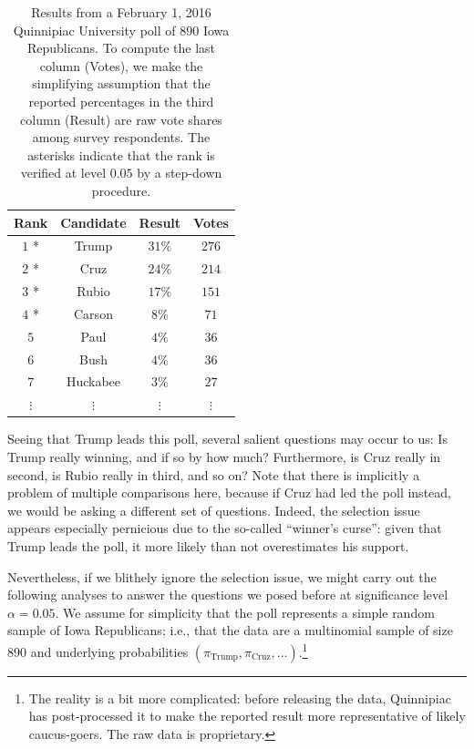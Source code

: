\documentclass[11pt]{article}
\theoremstyle{definition}
\theoremstyle{custom}
\begin{document}
\begin{table}[htbp]
\centering
\begin{tabular}{c c c c}
	\hline
	Rank & Candidate & Result & Votes \\
	\hline
	$1$ * & Trump & $31\%$ & $276$ \\
	$2$ * & Cruz & $24\%$ & $214$ \\
	$3$ * & Rubio & $17\%$ & $151$ \\
	$4$ * & Carson & $8\%$ & $71$ \\
	$5$ & Paul & $4\%$ & $36$ \\
	$6$ & Bush & $4\%$ & $36$ \\
	$7$ & Huckabee & $3\%$ & $27$ \\
	$\vdots$ & $\vdots$ & $\vdots $ & $\vdots$ \\
	\hline
\end{tabular}
\caption{Results from a February 1, 2016 Quinnipiac University poll of $890$ Iowa Republicans. To compute the last column (Votes), we make the simplifying assumption that the reported percentages in the third column (Result) are raw vote shares among survey respondents. The asterisks indicate that the rank is verified at level $0.05$ by a step-down procedure.}
\label{tbl:poll}
\end{table}

Seeing that Trump leads this poll, several salient questions may occur to us: Is Trump really winning, and if so by how much? Furthermore, is Cruz really in second, is Rubio really in third, and so on? Note that there is implicitly a problem of multiple comparisons here, because if Cruz had led the poll instead, we would be asking a different set of questions. Indeed, the selection issue appears especially pernicious due to the so-called ``winner's curse'': given that Trump leads the poll, it more likely than not overestimates his support.

Nevertheless, if we blithely ignore the selection issue, we might carry out the following analyses to answer the questions we posed before at significance level $\alpha = 0.05$. We assume for simplicity that the poll represents a simple random sample of Iowa Republicans; i.e., that the data are a multinomial sample of size $890$ and underlying probabilities $\left(\pi_{\text{Trump}}, \pi_{\text{Cruz}}, \ldots\right)$.\footnote{The reality is a bit more complicated: before releasing the data, Quinnipiac has post-processed it to make the reported result more representative of likely caucus-goers. The raw data is proprietary.}
\end{document}
